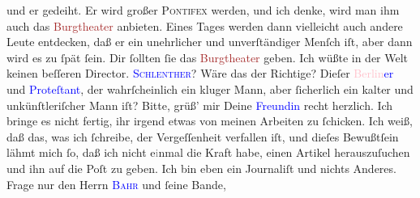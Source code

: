                und er gedeiht. Er wird großer \textsc{Pontifex} werden, und ich
               denke, \label{K_L02834-666v}\label{K_L02834-666h} wird man ihm auch das \textcolor{brown}{Burgtheater}{}\ledrightnote{\textcolor{brown}{Burgtheater}} anbieten. Eines Tages werden dann vielleicht auch andere Leute
               entdecken, daß er ein unehrlicher und unverſtändiger Menſch iſt, aber dann wird es zu ſpät
               ſein.\pend
           \pstart
           {\pb}Dir ſollten ſie das \textcolor{brown}{Burgtheater}{}\ledrightnote{\textcolor{brown}{Burgtheater}} geben. Ich wüßte in der Welt keinen beſſeren Director. \textsc{\textcolor{blue}{Schlenther}{}\ledrightnote{\textcolor{blue}{Paul Schlenther}}}? Wäre das der \strikeout{\textcolor{gray}{×}} Richtige? Dieſer \textcolor{blue}{\textcolor{pink}{Berlin}{}\ledrightnote{\textcolor{pink}{Berlin}}er}{} und \textcolor{blue}{Proteſtant}{}, der wahrſcheinlich ein kluger
               Mann, aber ſicherlich ein kalter und  unkünſtleriſcher Mann iſt?\pend
           \pstart
           Bitte, grüß’ mir Deine \textcolor{blue}{Freundin}{} recht herzlich. Ich bringe es nicht fertig, ihr irgend etwas von
               meinen Arbeiten zu ſchicken. Ich weiß, daß das, was ich ſchreibe, der Vergeſſenheit
               verfallen iſt, und dieſes Bewußtſein lähmt mich ſo, daß ich nicht  e\textcolor{gray}{i}nmal die Kraft habe, einen
               Artikel {\pb}herauszuſuchen und ihn auf die Poſt zu
               geben. Ich bin eben ein Journaliſt und nichts Anderes. Frage nur den Herrn 
               \textsc{\textcolor{blue}{Bahr}{}\ledrightnote{\textcolor{blue}{Hermann Bahr}}} und ſeine Bande,
